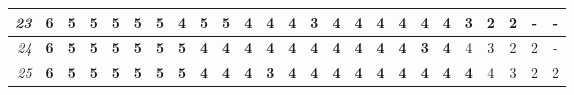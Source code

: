 \documentclass[12pt,landscape]{article}
\begin{document}
\begin{center}
\begin{tabular}{c|c|c|c|c|c|c|c|c|c|c|c|c|c|c|c|c|c|c|c|c|c|c|c|c|}
\multicolumn{1}{|r||}{\it 23} & {\bf 6} & {\bf 5} & {\bf 5} & {\bf 5} & {\bf 5} & {\bf 5} & {\bf 4} & {\bf 5} & {\bf 5} & {\bf 4} & {\bf 4} & {\bf 4} & {\bf 3} & {\bf 4} & {\bf 4} & {\bf 4} & {\bf 4} & {\bf 4} & {\bf 4} & 3 & 2 & 2 & - & - \\ \hline
\multicolumn{1}{|r||}{\it 24} & {\bf 6} & {\bf 5} & {\bf 5} & {\bf 5} & {\bf 5} & {\bf 5} & {\bf 5} & {\bf 4} & {\bf 4} & {\bf 4} & {\bf 4} & {\bf 4} & {\bf 4} & {\bf 4} & {\bf 4} & {\bf 4} & {\bf 4} & {\bf 3} & {\bf 4} & 4 & 3 & 2 & 2 & - \\ \hline
\multicolumn{1}{|r||}{\it 25} & {\bf 6} & {\bf 5} & {\bf 5} & {\bf 5} & {\bf 5} & {\bf 5} & {\bf 5} & {\bf 4} & {\bf 4} & {\bf 4} & {\bf 3} & {\bf 4} & {\bf 4} & {\bf 4} & {\bf 4} & {\bf 4} & {\bf 4} & {\bf 4} & {\bf 4} & {\bf 4} & 4 & 3 & 2 & 2 \\ \hline
\end{tabular}

\end{center}
\end{document}
